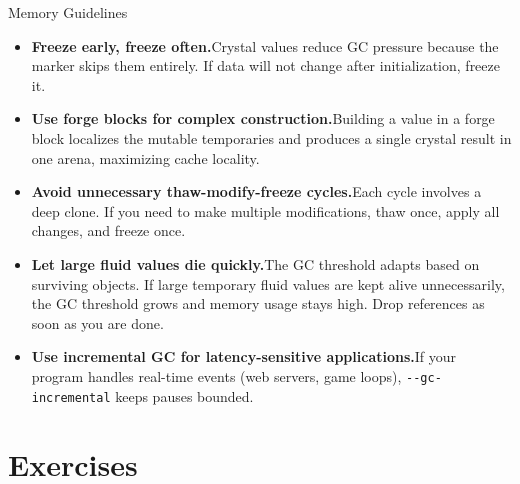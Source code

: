 \begin{tipbox}{Memory Guidelines}
\begin{itemize}
  \item \textbf{Freeze early, freeze often.}\quad Crystal values reduce GC pressure because the marker skips them entirely.
  If data will not change after initialization, freeze it.

  \item \textbf{Use forge blocks for complex construction.}\quad Building a value in a forge block localizes the mutable temporaries and produces a single crystal result in one arena, maximizing cache locality.

  \item \textbf{Avoid unnecessary thaw-modify-freeze cycles.}\quad Each cycle involves a deep clone. If you need to make multiple modifications, thaw once, apply all changes, and freeze once.

  \item \textbf{Let large fluid values die quickly.}\quad The GC threshold adapts based on surviving objects. If large temporary fluid values are kept alive unnecessarily, the GC threshold grows and memory usage stays high. Drop references as soon as you are done.

  \item \textbf{Use incremental GC for latency-sensitive applications.}\quad If your program handles real-time events (web servers, game loops), \lstinline|--gc-incremental| keeps pauses bounded.
\end{itemize}
\end{tipbox}

\section{Exercises}\label{sec:ch12-exercises}


